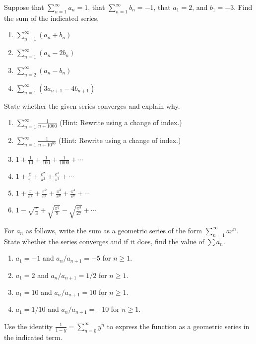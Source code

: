 \documentclass{exercises}
\begin{document}
Suppose that $\sum_{n=1}^{\infty}a_{n}=1$, that $\sum_{n=1}^{\infty}b_{n}=-1$, that $a_{1}=2$, and $b_{1}=-3$. Find the sum of the indicated series.

\begin{enumerate}[resume]
\item $\sum_{n=1}^{\infty}(a_{n}+b_{n})$
\item $\sum_{n=1}^{\infty}(a_{n}-2b_{n})$
\item $\sum_{n=2}^{\infty}(a_{n}-b_{n})$
\item $\sum_{n=1}^{\infty}(3a_{n+1}-4b_{n+1})$
\end{enumerate}

State whether the given series converges and explain why.

\begin{enumerate}[resume]
\item $\sum_{n=1}^{\infty}\frac{1}{n+1000}$ (Hint: Rewrite using a change of index.)
\item $\sum_{n=1}^{\infty}\frac{1}{n+10^{80}}$ (Hint: Rewrite using a change of index.)
\item $1+\frac{1}{10}+\frac{1}{100}+\frac{1}{1000}+\cdots$
\item $1+\frac{e}{\pi}+\frac{e^{2}}{\pi^{2}}+\frac{e^{3}}{\pi^{3}}+\cdots$
\item $1+\frac{\pi}{e^{2}}+\frac{\pi^{2}}{e^{4}}+\frac{\pi^{3}}{e^{6}}+\frac{\pi^{4}}{e^{8}}+\cdots$
\item $1-\sqrt{\frac{\pi}{3}}+\sqrt{\frac{\pi^{2}}{9}}-\sqrt{\frac{\pi^{3}}{27}}+\cdots$
\end{enumerate}

For $a_{n}$ as follows, write the sum as a geometric series of the form $\sum_{n=1}^{\infty}ar^{n}$. State whether the series converges and if it does, find the value of $\sum a_{n}$.

\begin{enumerate}[resume]
\item $a_{1}=-1$ and $a_{n}/a_{n+1}=-5$ for $n\ge1$.
\item $a_{1}=2$ and $a_{n}/a_{n+1}=1/2$ for $n\ge1$.
\item $a_{1}=10$ and $a_{n}/a_{n+1}=10$ for $n\ge1$.
\item $a_{1}=1/10$ and $a_{n}/a_{n+1}=-10$ for $n\ge1$.
\end{enumerate}

Use the identity $\frac{1}{1-y}=\sum_{n=0}^{\infty}y^{n}$ to express the function as a geometric series in the indicated term.
\end{document}
